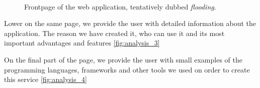 \begin{figure}[t]
  \myfloatalign
   \quad
   \quad
   \\
 \caption{Frontpage of the web application, tentatively dubbed \textit{flooding}.}
 \label{fig:analysis_frontpage}
\end{figure}

Lower on the same page, we provide the user with detailed information about the application. The reason we have created it, who can use it and its most important advantages and features \autoref{fig:analysis_3}

On the final part of the page, we provide the user with small examples of the programming languages, frameworks and other tools we used on order to create this service 
\autoref{fig:analysis_4}

